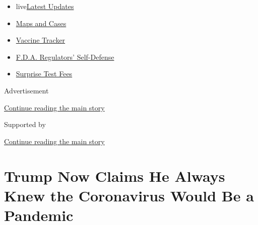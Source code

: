 \begin{itemize}
\tightlist
\item
  live\href{https://www.nytimes3xbfgragh.onion/2020/09/12/world/covid-19-coronavirus.html?name=styln-coronavirus-national\&region=TOP_BANNER\&block=storyline_menu_recirc\&action=click\&pgtype=Article\&impression_id=ab6f1a20-f52d-11ea-b5ea-07ef05a22056\&variant=undefined}{Latest
  Updates}
\item
  \href{https://www.nytimes3xbfgragh.onion/interactive/2020/us/coronavirus-us-cases.html?name=styln-coronavirus-national\&region=TOP_BANNER\&block=storyline_menu_recirc\&action=click\&pgtype=Article\&impression_id=ab6f1a21-f52d-11ea-b5ea-07ef05a22056\&variant=undefined}{Maps
  and Cases}
\item
  \href{https://www.nytimes3xbfgragh.onion/interactive/2020/science/coronavirus-vaccine-tracker.html?name=styln-coronavirus-national\&region=TOP_BANNER\&block=storyline_menu_recirc\&action=click\&pgtype=Article\&impression_id=ab6f1a22-f52d-11ea-b5ea-07ef05a22056\&variant=undefined}{Vaccine
  Tracker}
\item
  \href{https://www.nytimes3xbfgragh.onion/2020/09/10/us/politics/fda-coronavirus-vaccine.html?name=styln-coronavirus-national\&region=TOP_BANNER\&block=storyline_menu_recirc\&action=click\&pgtype=Article\&impression_id=ab6f1a23-f52d-11ea-b5ea-07ef05a22056\&variant=undefined}{F.D.A.
  Regulators' Self-Defense}
\item
  \href{https://www.nytimes3xbfgragh.onion/2020/09/09/upshot/coronavirus-surprise-test-fees.html?name=styln-coronavirus-national\&region=TOP_BANNER\&block=storyline_menu_recirc\&action=click\&pgtype=Article\&impression_id=ab6f1a24-f52d-11ea-b5ea-07ef05a22056\&variant=undefined}{Surprise
  Test Fees}
\end{itemize}

Advertisement

\protect\hyperlink{after-top}{Continue reading the main story}

Supported by

\protect\hyperlink{after-sponsor}{Continue reading the main story}

\hypertarget{trump-now-claims-he-always-knew-the-coronavirus-would-be-a-pandemic}{%
\section{Trump Now Claims He Always Knew the Coronavirus Would Be a
Pandemic}\label{trump-now-claims-he-always-knew-the-coronavirus-would-be-a-pandemic}}


